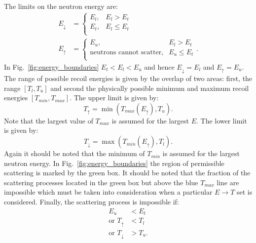 \documentclass[review]{elsarticle}
\begin{document}
The limits on the neutron energy are:
\begin{align}
 E_{\downarrow} & = \left\{ \begin{array}{ll}
         E_l, & E_l > E_t \\
         E_t, & E_l \le E_t  \\
         \end{array}
         \right .     \nonumber \\
E_{\uparrow} & = \left\{ \begin{array}{ll}
         E_u, & E_l > E_t \\
         \text{neutrons cannot scatter}, & E_u \le E_t  \\
         \end{array}
         \right .      .   
\end{align} 
In Fig.~\ref{fig:energy_boundaries} $E_t< E_l < E_u$ and hence $E_{\downarrow}=E_l$ and $E_{\uparrow} = E_u$. 
The range of possible recoil energies is given by the overlap of two areas: first, the range $[T_l, T_u]$ and second the physically possible minimum and maximum recoil energies $[T_{min}, T_{max}]$. The upper limit is given by:
\begin{equation}
   T_{\uparrow} = \min \left( T_{max}(E_{\uparrow}), T_u \right).
\end{equation}
Note that the largest value of $T_{max}$ is assumed for the largest $E$. The lower limit is given by:
\begin{equation}
   T_{\downarrow} = \max \left( T_{min}(E_{\uparrow}), T_l \right).
\end{equation}
Again it should be noted that the minimum of $T_{min}$ is assumed for the largest neutron energy. 
In Fig.~\ref{fig:energy_boundaries} the region of permissible scattering is marked by the green box.
It should be noted that the fraction of the scattering processes located in the green box but above the blue $T_{max}$ line are impossible which must be taken into consideration when a particular $E \rightarrow T$ set is considered.
Finally, the scattering process is impossible if:
\begin{align}
   E_u & < E_t \nonumber \\
   \text{or } T_{\uparrow} & < T_l \nonumber \\
   \text{or } T_{\downarrow} & > T_u. 
\end{align}
\end{document}
